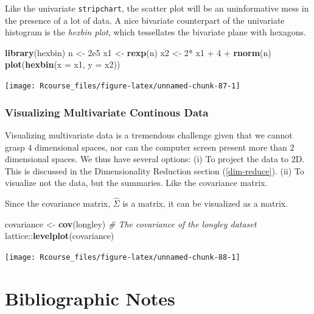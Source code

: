 \documentclass[]{book}
\newenvironment{Shaded}{\begin{snugshade}}{\end{snugshade}}
\newcommand{\KeywordTok}[1]{\textcolor[rgb]{0.13,0.29,0.53}{\textbf{{#1}}}}
\newcommand{\DataTypeTok}[1]{\textcolor[rgb]{0.13,0.29,0.53}{{#1}}}
\newcommand{\DecValTok}[1]{\textcolor[rgb]{0.00,0.00,0.81}{{#1}}}
\newcommand{\FloatTok}[1]{\textcolor[rgb]{0.00,0.00,0.81}{{#1}}}
\newcommand{\StringTok}[1]{\textcolor[rgb]{0.31,0.60,0.02}{{#1}}}
\newcommand{\CommentTok}[1]{\textcolor[rgb]{0.56,0.35,0.01}{\textit{{#1}}}}
\newcommand{\NormalTok}[1]{{#1}}
\theoremstyle{definition}
\theoremstyle{definition}
\theoremstyle{remark}
\begin{document}
Like the univariate \texttt{stripchart}, the scatter plot will be an
uninformative mess in the presence of a lot of data. A nice bivariate
counterpart of the univariate histogram is the \emph{hexbin plot}, which
tessellates the bivariate plane with hexagons.

\begin{Shaded}
\begin{Highlighting}[]
\KeywordTok{library}\NormalTok{(hexbin)}
\NormalTok{n <-}\StringTok{ }\FloatTok{2e5}
\NormalTok{x1 <-}\StringTok{ }\KeywordTok{rexp}\NormalTok{(n)}
\NormalTok{x2 <-}\StringTok{ }\DecValTok{2}\NormalTok{*}\StringTok{ }\NormalTok{x1 +}\StringTok{ }\DecValTok{4} \NormalTok{+}\StringTok{ }\KeywordTok{rnorm}\NormalTok{(n)}
\KeywordTok{plot}\NormalTok{(}\KeywordTok{hexbin}\NormalTok{(}\DataTypeTok{x =} \NormalTok{x1, }\DataTypeTok{y =} \NormalTok{x2))}
\end{Highlighting}
\end{Shaded}

\texttt{[image: Rcourse\_files/figure-latex/unnamed-chunk-87-1]}

\subsubsection{Visualizing Multivariate Continous
Data}\label{visualizing-multivariate-continous-data}

Visualizing multivariate data is a tremendous challenge given that we
cannot grasp \(4\) dimensional spaces, nor can the computer screen
present more than \(2\) dimensional spaces. We thus have several
options: (i) To project the data to 2D. This is discussed in the
Dimensionality Reduction section (\ref{dim-reduce}). (ii) To visualize
not the data, but the summaries. Like the covariance matrix.

Since the covariance matrix, \(\hat \Sigma\) is a matrix, it can be
visualized as a matrix.

\begin{Shaded}
\begin{Highlighting}[]
\NormalTok{covariance <-}\StringTok{ }\KeywordTok{cov}\NormalTok{(longley) }\CommentTok{# The covariance of the longley dataset}
\NormalTok{lattice::}\KeywordTok{levelplot}\NormalTok{(covariance)}
\end{Highlighting}
\end{Shaded}

\texttt{[image: Rcourse\_files/figure-latex/unnamed-chunk-88-1]}

\section{Bibliographic Notes}\label{bibliographic-notes-2}
\end{document}
